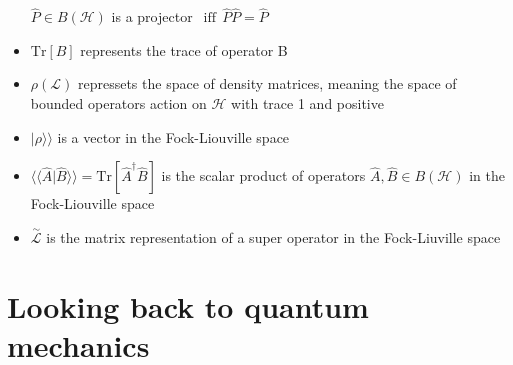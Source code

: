 \begin{itemize}
 $ \hat{P }\in B (\mathcal{H }) $  is a projector 
 $ \ \ \text{iff}\ \ \hat{P }\hat{P }=\hat{P } $ \item
 $ \text{Tr}\left[B \right] $  represents the trace of operator B 
\item
 $ \rho (\mathcal{L }) $  repressets the space of density matrices, meaning the space of
 bounded operators action on
 $ \mathcal{H } $  with trace 1 and positive
\item
 $ |\rho \rangle\rangle  $  is a vector in the Fock-Liouville space
\item
 $ \langle\langle\hat{A }|\hat{B }\rangle\rangle =\text{Tr}\left[\hat{A }^\dagger \hat{B }\right] $  is the scalar product of operators 
 $ \hat{A },\hat{B }\in B (\mathcal{H }) $  in the Fock-Liouville space
\item
 $ \overset{\sim}{\mathcal{L }} $  is the matrix representation of a super operator in the
 Fock-Liuville space
\end{itemize}
 \section{Looking back to quantum mechanics}
